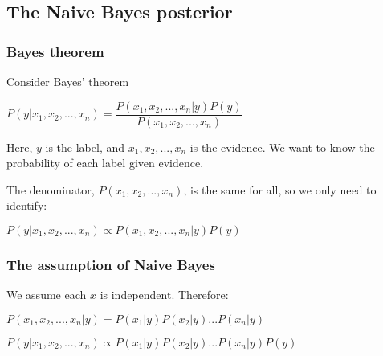 
\subsection{The Naive Bayes posterior}

\subsubsection{Bayes theorem}

Consider Bayes' theorem

\(P(y|x_1,x_2,...,x_n)=\dfrac{P(x_1,x_2,...,x_n|y)P(y)}{P(x_1,x_2,...,x_n)}\)

Here, \(y\) is the label, and \(x_1,x_2,...,x_n\) is the evidence. We want to know the probability of each label given evidence.

The denominator, \(P(x_1,x_2,...,x_n)\), is the same for all, so we only need to identify:

\(P(y|x_1,x_2,...,x_n)\propto P(x_1,x_2,...,x_n|y)P(y)\)

\subsubsection{The assumption of Naive Bayes}

We assume each \(x\) is independent. Therefore:

\(P(x_1,x_2,...,x_n|y)=P(x_1|y)P(x_2|y)...P(x_n|y)\)

\(P(y|x_1,x_2,...,x_n)\propto P(x_1|y)P(x_2|y)...P(x_n|y)P(y)\)

